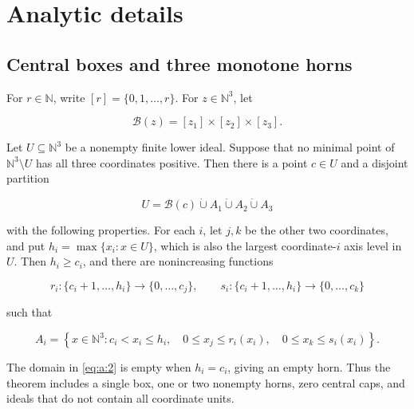 \section{Analytic details}\label{sec:analytic}

\subsection{Central boxes and three monotone horns}\label{sec:analytic-a}

For \(r\in\mathbb N\), write \([r]=\{0,1,\ldots,r\}\). For
\(z\in\mathbb N^3\), let

\[
\mathcal B(z)=[z_1]\times[z_2]\times[z_3].
\]

\begin{theorem}\label{theorem:a:1.1}

Let \(U\subseteq\mathbb N^3\) be a nonempty finite lower ideal. Suppose
that no minimal point of \(\mathbb N^3\setminus U\) has all three
coordinates positive. Then there is a point \(c\in U\) and a disjoint
partition

\begin{equation}
U=\mathcal B(c)\mathbin{\dot\cup}A_1
 \mathbin{\dot\cup}A_2\mathbin{\dot\cup}A_3
\label{eq:a:1}
\end{equation}

with the following properties. For each \(i\), let \(j,k\) be the other
two coordinates, and put \(h_i=\max\{x_i:x\in U\}\), which is also the
largest coordinate-\(i\) axis level in \(U\). Then \(h_i\ge c_i\), and
there are nonincreasing functions

\begin{equation}
r_i:\{c_i+1,\ldots,h_i\}\longrightarrow\{0,\ldots,c_j\},
\qquad
s_i:\{c_i+1,\ldots,h_i\}\longrightarrow\{0,\ldots,c_k\}
\label{eq:a:2}
\end{equation}

such that

\begin{equation}
A_i=
\left\{x\in\mathbb N^3:
c_i<x_i\le h_i,\quad
0\le x_j\le r_i(x_i),\quad
0\le x_k\le s_i(x_i)
\right\}.
\label{eq:a:3}
\end{equation}

The domain in \eqref{eq:a:2} is empty when \(h_i=c_i\), giving an empty horn. Thus
the theorem includes a single box, one or two nonempty horns, zero central
caps, and ideals that do not contain all coordinate units.

\end{theorem}
